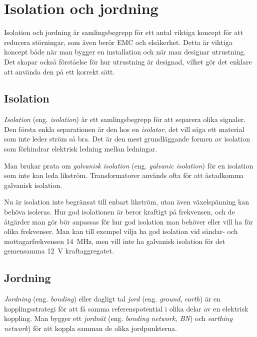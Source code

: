 \chapter[Isolation och jord]{Isolation och jordning}

\noindent Isolation och jordning är samlingsbegrepp för ett antal viktiga koncept för
att reducera störningar, som även berör EMC och elsäkerhet.
Detta är viktiga koncept både när man bygger en installation och när man
designar utrustning.
Det skapar också förståelse för hur utrustning är designad, vilket gör det
enklare att använda den på ett korrekt sätt.

\section{Isolation}

\emph{Isolation} (eng. \emph{isolation}) är ett samlingsbegrepp för att separera
olika signaler.
Den första enkla separationen är den hos en \emph{isolator}, det vill säga ett
material som inte leder ström så bra.
Det är den mest grundläggande formen av isolation som förhindrar elektrisk
ledning mellan ledningar.

Man brukar prata om \emph{galvanisk isolation} (eng. \emph{galvanic isolation})
för en isolation som inte kan leda likström.
Transformatorer används ofta för att åstadkomma galvanisk isolation.

Nu är isolation inte begränsat till enbart likström, utan även växelspänning
kan behöva isoleras.
Hur god isolationen är beror kraftigt på frekvensen, och de åtgärder man gör
bör anpassas för hur god isolation man behöver eller vill ha för olika
frekvenser.
Man kan till exempel vilja ha god isolation vid sändar- och mottagarfrekvensen
\qty{14}{\mega\hertz}, men vill inte ha galvanisk isolation för det gemensamma
\qty{12}{\volt} kraftaggregatet.

\section{Jordning}

\emph{Jordning} (eng. \emph{bonding}) eller dagligt tal \emph{jord} (eng.
\emph{ground}, \emph{earth}) är en kopplingsstrategi för att få samma
referenspotential i olika delar av en elektrisk koppling.
Man bygger ett \emph{jordnät} (eng. \emph{bonding network, BN})
\cite[kap 3.2.1]{K27-1991} och \emph{earthing network})
\cite[kap 3.1.3]{K27-1991} för att koppla samman de olika jordpunkterna.

